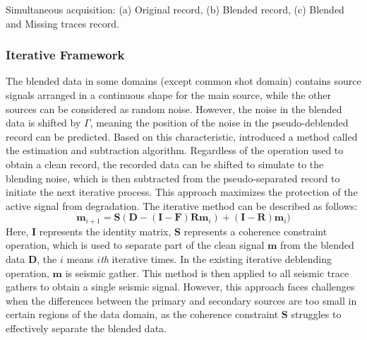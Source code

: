 \documentclass{segabs}
\begin{document}
{Simultaneous acquisition: (a) Original record, (b) Blended record, (c) Blended and Missing traces record.}
\subsubsection{Iterative Framework}

The blended data in some domains (except common shot domain) contains source signals arranged in a continuous shape for the main source, while the other sources can be considered as random noise. However, the noise in the blended data is shifted by $\Gamma$, meaning the position of the noise in the pseudo-deblended record can be predicted. Based on this characteristic, \cite{mahdad2011} introduced a method called the estimation and subtraction algorithm. Regardless of the operation used to obtain a clean record, the recorded data can be shifted to simulate to the blending noise, which is then subtracted from the pseudo-separated record to initiate the next iterative process. This approach maximizes the protection of the active signal from degradation. The iterative method can be described as follows:
\begin{equation}
\mathbf{m}_{i+1} = \mathbf{S}(\mathbf{D}-(\mathbf{I}-\mathbf{F})\mathbf{R} \mathbf{m}_i)+(\mathbf{I}-\mathbf{R})\mathbf{m}_i)
\end{equation}
Here, $\mathbf{I}$ represents the identity matrix, $\mathbf{S}$ represents a coherence constraint operation, which is used to separate part of the clean signal $\mathbf{m}$ from the blended data $\mathbf{D}$, the $i$ means $i$\textit{th} iterative times. In the existing iterative deblending operation, $\mathbf{m}$ is seismic gather. This method is then applied to all seismic trace gathers to obtain a single seismic signal. However, this approach faces challenges when the differences between the primary and secondary sources are too small in certain regions of the data domain, as the coherence constraint $\mathbf{S}$ struggles to effectively separate the blended data. 
\end{document}
